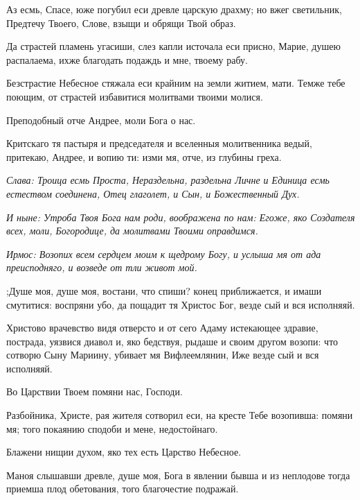 Аз есмь, Спасе, юже погубил еси древле царскую драхму; но вжег светильник, Предтечу Твоего, Слове, взыщи и обрящи Твой образ.




Да страстей пламень угасиши, слез капли источала еси присно, Марие, душею распалаема, ихже благодать подаждь и мне, твоему рабу.




Безстрастие Небесное стяжала еси крайним на земли житием, мати. Темже тебе поющим, от страстей избавитися молитвами твоими молися.


Преподобный отче Андрее, моли Бога о нас.


Критскаго тя пастыря и председателя и вселенныя молитвенника ведый, притекаю, Андрее, и вопию ти: изми мя, отче, из глубины греха.


\itshape Слава\normalfont{}: Троица есмь Проста, Нераздельна, раздельна Личне и Единица есмь естеством соединена, Отец глаголет, и Сын, и Божественный Дух.


\itshape И ныне\normalfont{}: Утроба Твоя Бога нам роди, воображена по нам: Егоже, яко Создателя всех, моли, Богородице, да молитвами Твоими оправдимся.


\itshape Ирмос\normalfont{}: Возопих всем сердцем моим к щедрому Богу, и услыша мя от ада преисподняго, и возведе от тли живот мой. 



;Душе моя, душе моя, востани, что спиши? конец приближается, и имаши смутитися: воспряни убо, да пощадит тя Христос Бог, везде сый и вся исполняяй. 




Христово врачевство видя отверсто и от сего Адаму истекающее здравие, пострада, уязвися диавол и, яко бедствуя, рыдаше и своим другом возопи: что сотворю Сыну Мариину, убивает мя Вифлеемлянин, Иже везде сый и вся исполняяй. 



Во Царствии Твоем помяни нас, Господи.


Разбойника, Христе, рая жителя сотворил еси, на кресте Тебе возопивша: помяни мя; того покаянию сподоби и мене, недостойнаго.


Блажени нищии духом, яко тех есть Царство Небесное.


Маноя слышавши древле, душе моя, Бога в явлении бывша и из неплодове тогда приемша плод обетования, того благочестие подражай.


